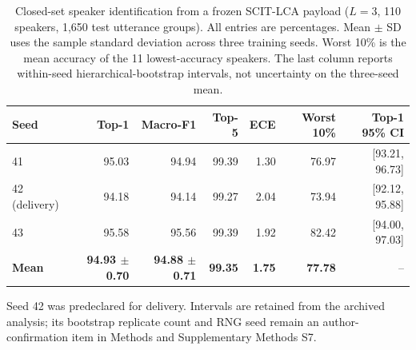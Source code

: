 \begin{table}[t]
\centering
\caption{Closed-set speaker identification from a frozen SCIT-LCA payload ($L=3$, 110 speakers, 1,650 test utterance groups). All entries are percentages. Mean $\pm$ SD uses the sample standard deviation across three training seeds. Worst 10\% is the mean accuracy of the 11 lowest-accuracy speakers. The last column reports within-seed hierarchical-bootstrap intervals, not uncertainty on the three-seed mean.}
\label{tab:rv2-speaker}
\small\setlength{\tabcolsep}{5pt}
\begin{tabular}{lrrrrrr}
\toprule
Seed & Top-1 & Macro-F1 & Top-5 & ECE & Worst 10\% & Top-1 95\% CI\\
\midrule
41 & 95.03 & 94.94 & 99.39 & 1.30 & 76.97 & [93.21, 96.73]\\
42 (delivery) & 94.18 & 94.14 & 99.27 & 2.04 & 73.94 & [92.12, 95.88]\\
43 & 95.58 & 95.56 & 99.39 & 1.92 & 82.42 & [94.00, 97.03]\\
\textbf{Mean} & \textbf{94.93 $\pm$ 0.70} & \textbf{94.88 $\pm$ 0.71} & \textbf{99.35} & \textbf{1.75} & \textbf{77.78} & --\\
\bottomrule
\end{tabular}
\par\smallskip
\parbox{\textwidth}{\footnotesize Seed 42 was predeclared for delivery. Intervals are retained from the archived analysis; its bootstrap replicate count and RNG seed remain an author-confirmation item in Methods and Supplementary Methods S7.}
\end{table}
